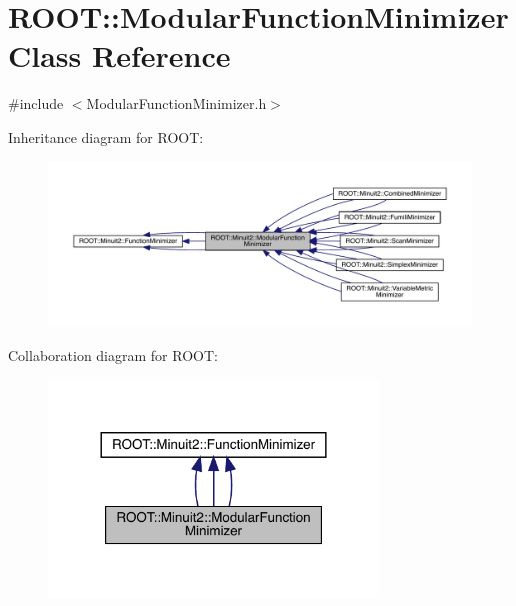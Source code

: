 \hypertarget{classROOT_1_1Minuit2_1_1ModularFunctionMinimizer}{}\section{R\+O\+OT\+:\+:Modular\+Function\+Minimizer Class Reference}
\label{classROOT_1_1Minuit2_1_1ModularFunctionMinimizer}


{\ttfamily \#include $<$Modular\+Function\+Minimizer.\+h$>$}



Inheritance diagram for R\+O\+OT\+:
\nopagebreak
\begin{figure}[H]
\begin{center}
\leavevmode
\includegraphics[width=350pt]{da/d9e/classROOT_1_1Minuit2_1_1ModularFunctionMinimizer__inherit__graph}
\end{center}
\end{figure}


Collaboration diagram for R\+O\+OT\+:
\nopagebreak
\begin{figure}[H]
\begin{center}
\leavevmode
\includegraphics[width=248pt]{dc/dfc/classROOT_1_1Minuit2_1_1ModularFunctionMinimizer__coll__graph}
\end{center}
\end{figure}
